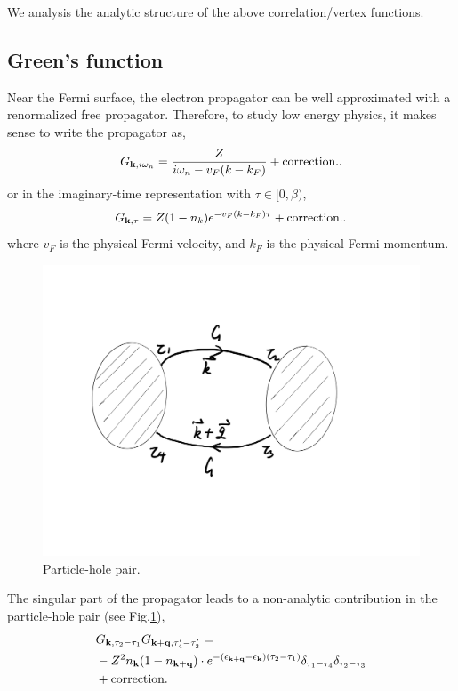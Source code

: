 \documentclass[reprint,amsmath,amssymb,aps,prb]{revtex4-1}
\begin{document}
We analysis the analytic structure of the above correlation/vertex functions.

\subsection{Green's function}

Near the Fermi surface, the electron propagator can be well approximated with a renormalized free propagator. Therefore, to study low energy physics, it makes sense to write the propagator as,
\begin{equation}
    G_{\mathbf{k}, i\omega_n}=\frac{Z}{i\omega_n-v_F (k-k_F)}+\text{correction.}.
\end{equation}
or in the imaginary-time representation with $\tau \in [0, \beta)$,
\begin{equation}
    G_{\mathbf{k}, \tau}=Z(1-n_k)e^{-v_F (k-k_F)\tau}+\text{correction.}.
\end{equation}
where $v_F$ is the physical Fermi velocity, and $k_F$ is the physical Fermi momentum.

\begin{figure}
    \centering
    \label{fig:bubble}
    \includegraphics[width=0.7\linewidth]{figure/bubble.jpg}
    \vspace{-1.5cm}
    \caption{Particle-hole pair.}
\end{figure}

The singular part of the propagator leads to a non-analytic contribution in the particle-hole pair (see Fig.\ref{fig:bubble}),
\begin{align}
     & G_{\mathbf{k}, \tau_2-\tau_1} G_{\mathbf{k}+\mathbf{q},\tau_4'-\tau_3'}=\nonumber                                                                                    \\
     & -Z^2 n_{\mathbf{k}}(1-n_{\mathbf{k}+\mathbf{q}})\cdot e^{-(\epsilon_{\mathbf{k}+\mathbf{q}}-\epsilon_{\mathbf{k}})(\tau_2-\tau_1)} \delta_{\tau_1-\tau_4}\delta_{\tau_2-\tau_3} \nonumber \\
     & +\text{correction}.
\end{align}
\end{document}
